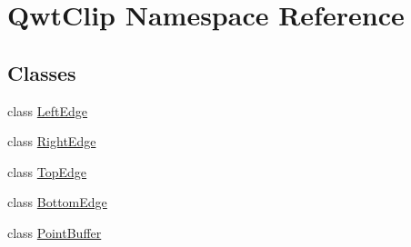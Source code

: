 \hypertarget{namespace_qwt_clip}{\section{Qwt\-Clip Namespace Reference}
\label{namespace_qwt_clip}
}
\subsection*{Classes}
\begin{DoxyCompactItemize}
\item 
class \hyperlink{class_qwt_clip_1_1_left_edge}{Left\-Edge}
\item 
class \hyperlink{class_qwt_clip_1_1_right_edge}{Right\-Edge}
\item 
class \hyperlink{class_qwt_clip_1_1_top_edge}{Top\-Edge}
\item 
class \hyperlink{class_qwt_clip_1_1_bottom_edge}{Bottom\-Edge}
\item 
class \hyperlink{class_qwt_clip_1_1_point_buffer}{Point\-Buffer}
\end{DoxyCompactItemize}
